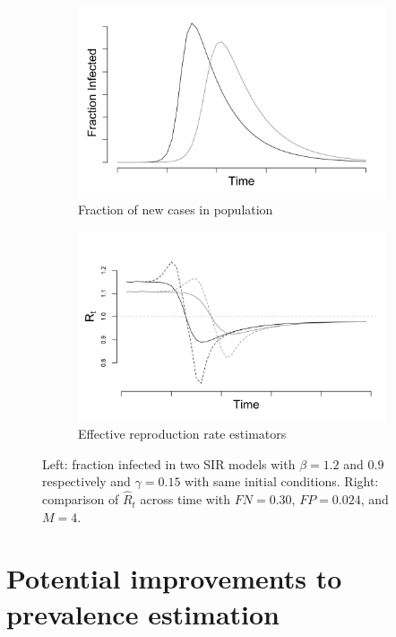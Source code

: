 \documentclass[11pt]{amsart}
\numberwithin{equation}{section}
\theoremstyle{plain}
\begin{document}
 \begin{figure}
 \centering
 \begin{subfigure}{.5\textwidth}
  \centering
  \includegraphics[width=.9\linewidth]{../figs/sir.png}
  \caption{Fraction of new cases in population}
  \label{fig:fracpop}
 \end{subfigure}%
 \begin{subfigure}{.5\textwidth}
  \centering
  \includegraphics[width=.9\linewidth]{../figs/sir_rt_comparison.png}
  \caption{Effective reproduction rate estimators}
  \label{fig:eff}
 \end{subfigure}
 \caption{Left: fraction infected in two SIR models with $\beta = 1.2$ and $0.9$ respectively and $\gamma = 0.15$ with same initial conditions. Right: comparison of $\hat R_t$ across time with $FN = 0.30$, $FP = 0.024$, and $M = 4$.}
 \label{fig:comparison}
 \end{figure}

 \section{Potential improvements to prevalence estimation}
 \label{section:improvedcasecount}
\end{document}
